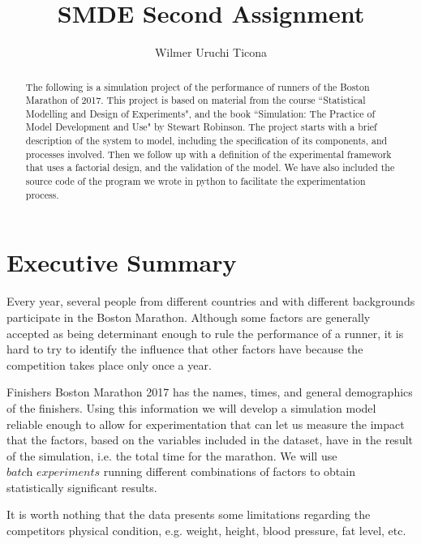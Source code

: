 \documentclass[11pt, oneside]{article}   	%
\title{SMDE Second Assignment}
\author{
  Wilmer Uruchi Ticona
}
\begin{document}
\maketitle

\begin{abstract}
The following is a simulation project of the performance of runners of the Boston Marathon of 2017. This project is based on material from the course ``Statistical Modelling and Design of Experiments", and the book ``Simulation: The Practice of Model Development and Use" by Stewart Robinson. The project starts with a brief description of the system to model, including the specification of its components, and processes involved. Then we follow up with a definition of the experimental framework that uses a factorial design, and the validation of the model. We have also included the source code of the program we wrote in python to facilitate the experimentation process.
\end{abstract}
\newpage
\tableofcontents

\newpage

\section{Executive Summary}
Every year, several people from different countries and with different backgrounds participate in the Boston Marathon. Although some factors are generally accepted as being determinant enough to rule the performance of a runner, it is hard to try to identify the influence that other factors have because the competition takes place only once a year.

Finishers Boston Marathon 2017 has the names, times, and general demographics of the finishers. Using this information we will develop a simulation model reliable enough to allow for experimentation that can let us measure the impact that the factors, based on the variables included in the dataset, have in the result of the simulation, i.e. the total time for the marathon. We will use $\textit{batch experiments}$ running different combinations of factors to obtain statistically significant results.

It is worth nothing that the data presents some limitations regarding the competitors physical condition, e.g. weight, height, blood pressure, fat level, etc. 
\end{document}
